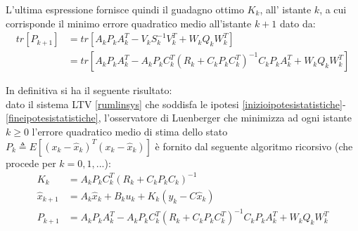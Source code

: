 \noindent L'ultima espressione fornisce quindi il guadagno ottimo $K_k$, all' istante $k$, a cui corrisponde il minimo errore quadratico medio all'istante $k+1$ dato da:
\begin{equation}
\begin{split}
tr[P_{k+1}]&=tr[A_kP_kA_k^T-V_kS^{-1}_kV^T_k+W_kQ_kW_k^T]\\ 
&=tr[A_kP_kA_k^T-A_kP_kC_k^T(R_k+C_kP_kC_k^T)^{-1}C_kP_kA_k^T+W_kQ_kW_k^T]
\end{split}
\end{equation}

\noindent In definitiva si ha il seguente risultato: \\
dato il sistema LTV \eqref{rumlinsys} che soddisfa le ipotesi \eqref{inizioipotesistatistiche}-\eqref{fineipotesistatistiche}, l'osservatore di Luenberger che minimizza ad ogni istante $k \geq 0$ l'errore quadratico medio di stima dello stato $P_k \triangleq E [(x_k - \hat{x}_k)^T(x_k - \hat{x}_k)]$ è fornito dal seguente algoritmo ricorsivo (che procede per $k = 0,1,...$):
\begin{align}
\label{luenb1}
K_k &= A_kP_kC_k^T(R_k+C_kP_kC_k)^{-1} \\
\label{luenb2}
\hat{x}_{k+1} &= A_k\hat{x}_k+B_ku_k+K_k(y_k-C\hat{x}_k)\\
\label{luenb3}
P_{k+1}&=A_kP_kA_k^T-A_kP_kC_k^T(R_k+C_kP_kC_k^T)^{-1}C_kP_kA_k^T+W_kQ_kW_k^T
\end{align}
\newpage